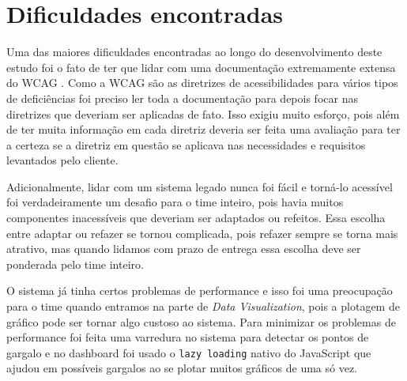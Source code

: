\section{Dificuldades encontradas}
\label{sec:dificuldades}
{
Uma das maiores dificuldades encontradas ao longo do desenvolvimento deste estudo foi o fato de ter que lidar com uma documentação extremamente extensa do WCAG \cite{WCAG20}. Como a WCAG \cite{WCAG20} são as diretrizes de acessibilidades para vários tipos de deficiências foi preciso ler toda a documentação para depois focar nas diretrizes que deveriam ser aplicadas de fato. Isso exigiu muito esforço, pois além de ter muita informação em cada diretriz deveria ser feita uma avaliação para ter a certeza se a diretriz em questão se aplicava nas necessidades e requisitos levantados pelo cliente.

Adicionalmente, lidar com um sistema legado nunca foi fácil e torná-lo acessível foi verdadeiramente um desafio para o time inteiro, pois havia muitos componentes inacessíveis que deveriam ser adaptados ou refeitos. Essa escolha entre adaptar ou refazer se tornou complicada, pois refazer sempre se torna mais atrativo, mas quando lidamos com prazo de entrega essa escolha deve ser ponderada pelo time inteiro.

O sistema já tinha certos problemas de performance e isso foi uma preocupação para o time quando entramos na parte de \textit{Data Visualization}, pois a plotagem de gráfico pode ser tornar algo custoso ao sistema. Para minimizar os problemas de performance foi feita uma varredura no sistema para detectar os pontos de gargalo e no dashboard foi usado o \lstinline{lazy loading} nativo do JavaScript que ajudou em possíveis gargalos ao se plotar muitos gráficos de uma só vez. 
}

